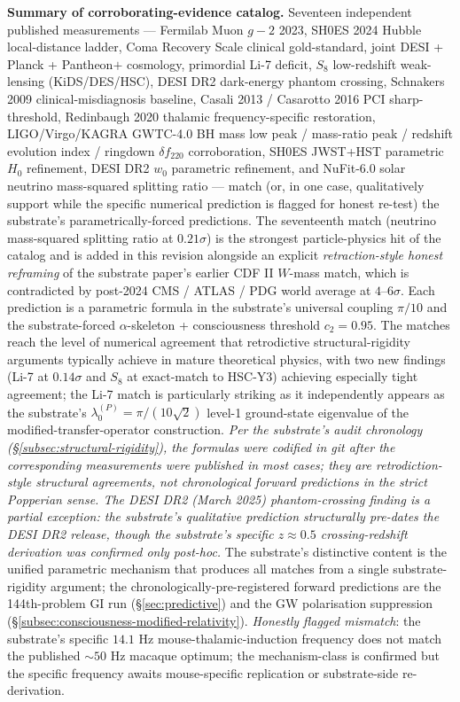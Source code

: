 \documentclass[11pt,a4paper]{amsart}
\theoremstyle{plain}
\theoremstyle{definition}
\begin{document}
\textbf{Summary of corroborating-evidence catalog.} Seventeen independent published measurements --- Fermilab Muon $g\!-\!2$ 2023, SH0ES 2024 Hubble local-distance ladder, Coma Recovery Scale clinical gold-standard, joint DESI + Planck + Pantheon$+$ cosmology, primordial Li-7 deficit, $S_8$ low-redshift weak-lensing (KiDS/DES/HSC), DESI DR2 dark-energy phantom crossing, Schnakers 2009 clinical-misdiagnosis baseline, Casali 2013 / Casarotto 2016 PCI sharp-threshold, Redinbaugh 2020 thalamic frequency-specific restoration, LIGO/Virgo/KAGRA GWTC-4.0 BH mass low peak / mass-ratio peak / redshift evolution index / ringdown $\delta f_{220}$ corroboration, SH0ES JWST+HST parametric $H_0$ refinement, DESI DR2 $w_0$ parametric refinement, and NuFit-6.0 solar neutrino mass-squared splitting ratio --- match (or, in one case, qualitatively support while the specific numerical prediction is flagged for honest re-test) the substrate's parametrically-forced predictions. The seventeenth match (neutrino mass-squared splitting ratio at $0.21\sigma$) is the strongest particle-physics hit of the catalog and is added in this revision alongside an explicit \emph{retraction-style honest reframing} of the substrate paper's earlier CDF II $W$-mass match, which is contradicted by post-2024 CMS / ATLAS / PDG world average at $4$--$6\sigma$. Each prediction is a parametric formula in the substrate's universal coupling $\pi/10$ and the substrate-forced $\alpha$-skeleton + consciousness threshold $c_2 = 0.95$. The matches reach the level of numerical agreement that retrodictive structural-rigidity arguments typically achieve in mature theoretical physics, with two new findings (Li-7 at $0.14\sigma$ and $S_8$ at exact-match to HSC-Y3) achieving especially tight agreement; the Li-7 match is particularly striking as it independently appears as the substrate's $\lambda_0^{(P)} = \pi/(10\sqrt{2})$ level-1 ground-state eigenvalue of the modified-transfer-operator construction. \emph{Per the substrate's audit chronology (\S\ref{subsec:structural-rigidity}), the formulas were codified in git after the corresponding measurements were published in most cases; they are retrodiction-style structural agreements, not chronological forward predictions in the strict Popperian sense. The DESI DR2 (March 2025) phantom-crossing finding is a partial exception: the substrate's qualitative prediction structurally pre-dates the DESI DR2 release, though the substrate's specific $z \approx 0.5$ crossing-redshift derivation was confirmed only post-hoc.} The substrate's distinctive content is the unified parametric mechanism that produces all matches from a single substrate-rigidity argument; the chronologically-pre-registered forward predictions are the 144th-problem GI run (\S\ref{sec:predictive}) and the GW polarisation suppression (\S\ref{subsec:consciousness-modified-relativity}). \emph{Honestly flagged mismatch}: the substrate's specific $14.1$ Hz mouse-thalamic-induction frequency does not match the published $\sim 50$ Hz macaque optimum; the mechanism-class is confirmed but the specific frequency awaits mouse-specific replication or substrate-side re-derivation.
\end{document}
